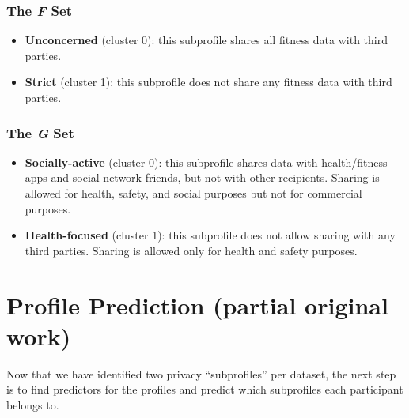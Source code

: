 \subsubsection{The \textit{F} Set}
\begin{itemize}
	\item \textbf{Unconcerned} (cluster 0): this subprofile shares all fitness data with third parties.
	
	\item \textbf{Strict} (cluster 1): this subprofile does not share any fitness data with third parties.
\end{itemize}


\subsubsection{The \textit{G} Set}
\begin{itemize}
	\item \textbf{Socially-active} (cluster 0): this subprofile shares data with health/fitness apps and social network friends, but not with other recipients. %
	Sharing is allowed for health, safety, and social purposes but not for commercial purposes.
	
	\item \textbf{Health-focused} (cluster 1): this subprofile does not allow sharing with any third parties. Sharing is allowed only for health and safety purposes. 
\end{itemize}

\section{Profile Prediction (partial original work)}
\label{sec:prediction}


Now that we have identified two privacy ``subprofiles'' per dataset, the next step is to find predictors for the profiles and predict which subprofiles each participant belongs to.  

